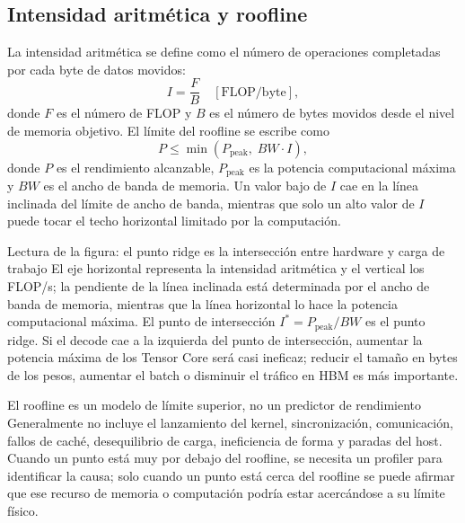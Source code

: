 \subsection{Intensidad aritmética y roofline}

La intensidad aritmética se define como el número de operaciones completadas por cada byte de datos movidos:
\[
I=\frac{F}{B}\quad [\mathrm{FLOP/byte}],
\]
donde $F$ es el número de FLOP y $B$ es el número de bytes movidos desde el nivel de memoria objetivo. El límite del roofline se escribe como
\[
P\leq \min(P_{\mathrm{peak}},\; BW\cdot I),
\]
donde $P$ es el rendimiento alcanzable, $P_{\mathrm{peak}}$ es la potencia computacional máxima y $BW$ es el ancho de banda de memoria. Un valor bajo de $I$ cae en la línea inclinada del límite de ancho de banda, mientras que solo un alto valor de $I$ puede tocar el techo horizontal limitado por la computación.


\begin{knowledgebox}{Lectura de la figura: el punto ridge es la intersección entre hardware y carga de trabajo}
El eje horizontal representa la intensidad aritmética y el vertical los FLOP/s; la pendiente de la línea inclinada está determinada por el ancho de banda de memoria, mientras que la línea horizontal lo hace la potencia computacional máxima. El punto de intersección $I^*=P_{\mathrm{peak}}/BW$ es el punto ridge. Si el decode cae a la izquierda del punto de intersección, aumentar la potencia máxima de los Tensor Core será casi ineficaz; reducir el tamaño en bytes de los pesos, aumentar el batch o disminuir el tráfico en HBM es más importante.
\end{knowledgebox}

\begin{warningbox}{El roofline es un modelo de límite superior, no un predictor de rendimiento}
Generalmente no incluye el lanzamiento del kernel, sincronización, comunicación, fallos de caché, desequilibrio de carga, ineficiencia de forma y paradas del host. Cuando un punto está muy por debajo del roofline, se necesita un profiler para identificar la causa; solo cuando un punto está cerca del roofline se puede afirmar que ese recurso de memoria o computación podría estar acercándose a su límite físico.
\end{warningbox}

